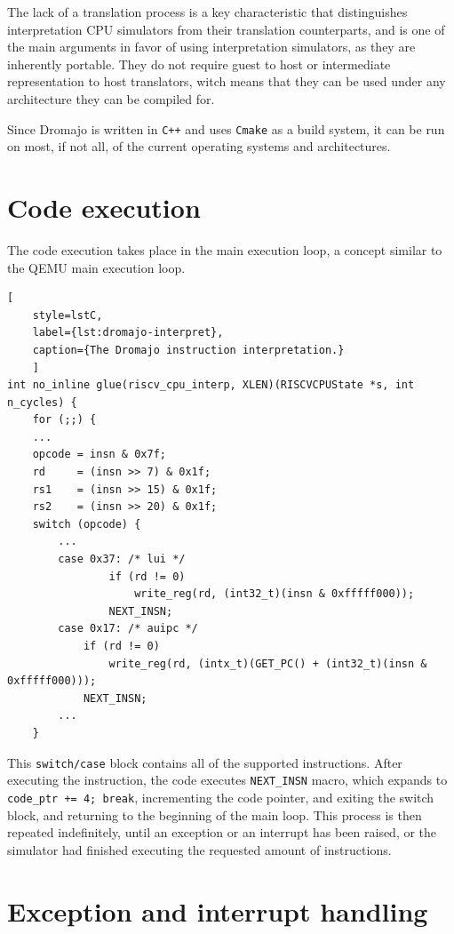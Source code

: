 The lack of a translation process is a key characteristic that distinguishes interpretation CPU simulators from their
translation counterparts, and is one of the main arguments in favor of using interpretation simulators, as they
are inherently portable. They do not require guest to host or intermediate representation to host translators, witch
means that they can be used under any architecture they can be compiled for.

Since Dromajo is written in \texttt{C++} and uses \texttt{Cmake} as a build system, it can be run on most, if not all,
of the current operating systems and architectures.

\pagebreak

\section{Code execution}

The code execution takes place in the main execution loop, a concept similar to the QEMU main execution loop.

\begin{lstlisting}[
    style=lstC,
    label={lst:dromajo-interpret},
    caption={The Dromajo instruction interpretation.}
    ]
int no_inline glue(riscv_cpu_interp, XLEN)(RISCVCPUState *s, int n_cycles) {
    for (;;) {
    ...
    opcode = insn & 0x7f;
    rd     = (insn >> 7) & 0x1f;
    rs1    = (insn >> 15) & 0x1f;
    rs2    = (insn >> 20) & 0x1f;
    switch (opcode) {
        ...
        case 0x37: /* lui */
                if (rd != 0)
                    write_reg(rd, (int32_t)(insn & 0xfffff000));
                NEXT_INSN;
        case 0x17: /* auipc */
            if (rd != 0)
                write_reg(rd, (intx_t)(GET_PC() + (int32_t)(insn & 0xfffff000)));
            NEXT_INSN;
        ...
    }
\end{lstlisting}

\noindent
This \texttt{switch/case} block contains all of the supported instructions. After executing the instruction, the code
executes \texttt{NEXT\_INSN} macro, which expands to \texttt{code\_ptr += 4; break}, incrementing the code pointer, and
exiting the switch block, and returning to the beginning of the main loop. This process is then repeated indefinitely,
until an exception or an interrupt has been raised, or the simulator had finished executing the requested amount of
instructions.

\section{Exception and interrupt handling}

